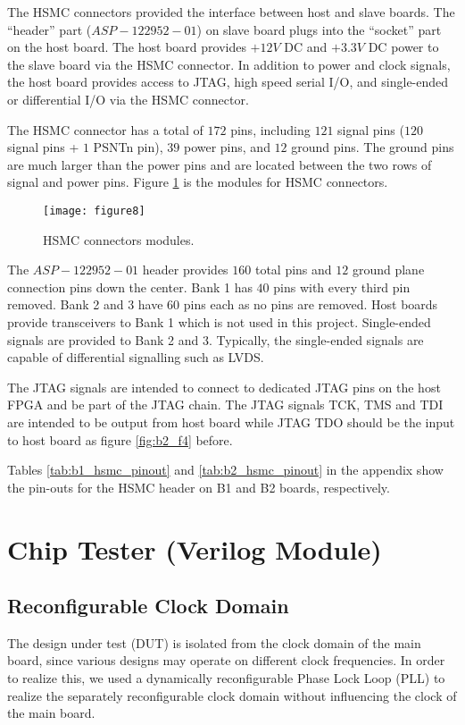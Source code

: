 The HSMC connectors provided the interface between host and slave boards. The ``header'' part ($ASP-122952-01$) on slave board plugs into the ``socket'' part on the host board. The host board provides $+12V$ DC and $+3.3V$ DC power to the slave board via the HSMC connector. In addition to power and clock signals, the host board provides access to JTAG, high speed serial I/O, and single-ended or differential I/O via the HSMC connector.

The HSMC connector has a total of $172$ pins, including $121$ signal pins ($120$ signal pins + $1$ PSNTn pin), $39$ power pins, and $12$ ground pins. The ground pins are much larger than the power pins and are located between the two rows of signal and power pins. Figure \ref{fig:b2_f8} is the modules for HSMC connectors.

\begin{figure}
 \centering
 \texttt{[image: figure8]}
 \caption{HSMC connectors modules.}
 \label{fig:b2_f8}
\end{figure}

The $ASP-122952-01$ header provides $160$ total pins and $12$ ground plane connection pins down the center. Bank 1 has $40$ pins with every third pin removed. Bank 2 and 3 have $60$ pins each as no pins are removed. Host boards provide transceivers to Bank 1 which is not used in this project. Single-ended signals are provided to Bank 2 and 3. Typically, the single-ended signals are capable of differential signalling such as LVDS.

The JTAG signals are intended to connect to dedicated JTAG pins on the host FPGA and be part of the JTAG chain. The JTAG signals TCK, TMS and TDI are intended to be output from host board while JTAG TDO should be the input to host board as figure \ref{fig:b2_f4} before.

Tables \ref{tab:b1_hsmc_pinout} and \ref{tab:b2_hsmc_pinout} in the appendix show the pin-outs for the HSMC header on B1 and B2 boards, respectively.


\section{Chip Tester (Verilog Module)}


\subsection{Reconfigurable Clock Domain}
The design under test (DUT) is isolated from the clock domain of the main board, since various designs may operate on different clock frequencies. In order to realize this, we used a dynamically reconfigurable Phase Lock Loop (PLL) to realize the separately reconfigurable clock domain without influencing the clock of the main board.

